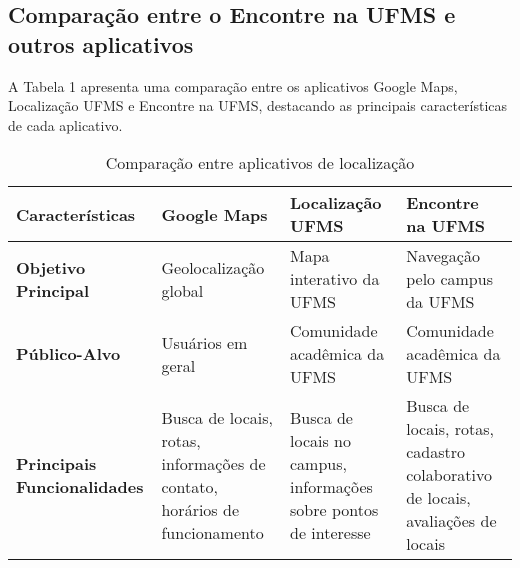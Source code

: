 \subsection{Comparação entre o Encontre na UFMS e outros aplicativos}
    A Tabela 1 apresenta uma comparação entre os aplicativos Google Maps, Localização UFMS e Encontre na UFMS, destacando as principais características de cada aplicativo.

\FloatBarrier

\begin{table}[h]
    \begin{tabularx}{\textwidth}{|X|X|X|X|}
        \hline
        \textbf{Características} & \textbf{Google Maps} & \textbf{Localização UFMS} & \textbf{Encontre na UFMS} \\ \hline
        \textbf{Objetivo Principal} & Geolocalização global & Mapa interativo da UFMS & Navegação pelo campus da UFMS \\ \hline
        \textbf{Público-Alvo} & Usuários em geral & Comunidade acadêmica da UFMS & Comunidade acadêmica da UFMS \\ \hline
        \textbf{Principais Funcionalidades} & Busca de locais, rotas, informações de contato, horários de funcionamento & Busca de locais no campus, informações sobre pontos de interesse & Busca de locais, rotas, cadastro colaborativo de locais, avaliações de locais \\ \hline
    \end{tabularx}
    \caption{Comparação entre aplicativos de localização}
    \label{tab:comparacao-aplicativos}
\end{table}
